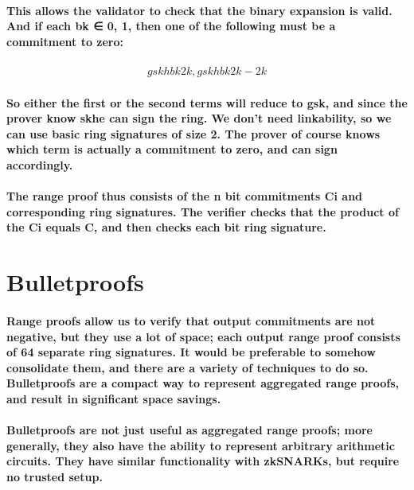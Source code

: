 \documentclass{article}
\begin{document}
\paragraph{This allows the validator to check that the binary expansion is valid.  And if each bk ∈ {0, 1}, then one of the following must be a commitment to zero:}

\begin{eqnarray}
  {gskhbk2k,gskhbk2k-2k} 
\end{eqnarray}

\paragraph{So either the first or the second terms will reduce to gsk, and since the prover know skhe can sign the ring.  We don’t need linkability, so we can use basic ring signatures of size 2. The prover of course knows which term is actually a commitment to zero, and can sign accordingly.}

\paragraph{The range proof thus consists of the n bit commitments Ci and corresponding ring signatures.  The verifier checks that the product of the Ci equals C, and then checks each bit ring signature.}



\section{Bulletproofs}

\paragraph{Range proofs allow us to verify that output commitments are not negative, but they use a lot of space; each output range proof consists of 64 separate ring signatures.  It would be preferable to somehow consolidate them, and there are a variety of techniques to do so.  Bulletproofs are a compact way to represent aggregated range proofs, and result in significant space savings.}

\paragraph{Bulletproofs are not just useful as aggregated range proofs; more generally, they also have the ability to represent arbitrary arithmetic circuits.  They have similar functionality with zkSNARKs, but require no trusted setup.}
\end{document}
